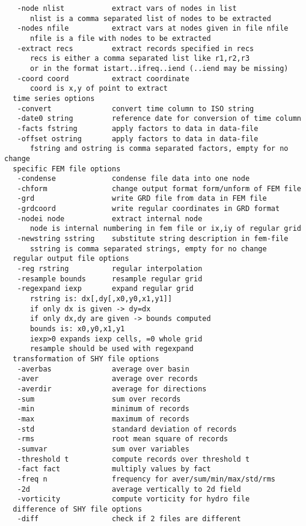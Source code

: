 \begin{verbatim}
   -node nlist           extract vars of nodes in list
      nlist is a comma separated list of nodes to be extracted
   -nodes nfile          extract vars at nodes given in file nfile
      nfile is a file with nodes to be extracted
   -extract recs         extract records specified in recs
      recs is either a comma separated list like r1,r2,r3
      or in the format istart..ifreq..iend (..iend may be missing)
   -coord coord          extract coordinate
      coord is x,y of point to extract
  time series options
   -convert              convert time column to ISO string
   -date0 string         reference date for conversion of time column
   -facts fstring        apply factors to data in data-file
   -offset ostring       apply factors to data in data-file
      fstring and ostring is comma separated factors, empty for no change
  specific FEM file options
   -condense             condense file data into one node
   -chform               change output format form/unform of FEM file
   -grd                  write GRD file from data in FEM file
   -grdcoord             write regular coordinates in GRD format
   -nodei node           extract internal node
      node is internal numbering in fem file or ix,iy of regular grid
   -newstring sstring    substitute string description in fem-file
      sstring is comma separated strings, empty for no change
  regular output file options
   -reg rstring          regular interpolation
   -resample bounds      resample regular grid
   -regexpand iexp       expand regular grid
      rstring is: dx[,dy[,x0,y0,x1,y1]]
      if only dx is given -> dy=dx
      if only dx,dy are given -> bounds computed
      bounds is: x0,y0,x1,y1
      iexp>0 expands iexp cells, =0 whole grid
      resample should be used with regexpand
  transformation of SHY file options
   -averbas              average over basin
   -aver                 average over records
   -averdir              average for directions
   -sum                  sum over records
   -min                  minimum of records
   -max                  maximum of records
   -std                  standard deviation of records
   -rms                  root mean square of records
   -sumvar               sum over variables
   -threshold t          compute records over threshold t
   -fact fact            multiply values by fact
   -freq n               frequency for aver/sum/min/max/std/rms
   -2d                   average vertically to 2d field
   -vorticity            compute vorticity for hydro file
  difference of SHY file options
   -diff                 check if 2 files are different

\end{verbatim}
